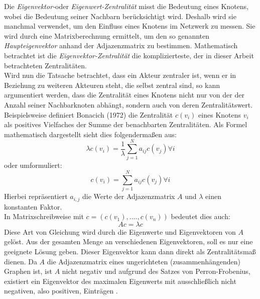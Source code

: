 Die \textit{Eigenvektor-}oder \textit{Eigenwert-Zentralität} misst die Bedeutung eines Knotens, wobei die Bedeutung seiner Nachbarn berücksichtigt wird. Deshalb wird sie manchmal verwendet, um den Einfluss eines Knotens im Netzwerk zu messen. Sie wird durch eine Matrixberechnung ermittelt, um den so genannten \textit{Haupteigenvektor} anhand der Adjazenzmatrix zu bestimmen. Mathematisch betrachtet ist die \textit{Eigenvektor-Zentralität} die komplizierteste, der in dieser Arbeit betrachteten Zentralitäten.\\
Wird nun die Tatsache betrachtet, dass ein Akteur zentraler ist, wenn er in Beziehung zu weiteren Akteuren steht, die selbst zentral sind, so kann argumentiert werden, dass die Zentralität eines Knotens nicht nur von der der Anzahl seiner Nachbarknoten abhängt, sondern auch von deren Zentralitätswert. Beispielsweise definiert Bonacich (1972) die Zentralität $c(v_i)$ eines Knotens $v_i$ als positives Vielfaches der Summe der benachbarten Zentralitäten. Als Formel mathematisch dargestellt sieht dies folgendermaßen aus:
\begin{equation}
     \lambda c(v_i) = \frac{1}{\lambda} \sum_{j=1}^{N}a_{ij}c(v_j) \forall i
\end{equation} oder umformuliert:  
\begin{equation}
     c(v_i) = \sum_{j=1}^{N}a_{ij}c(v_j) \forall i
\end{equation}
Hierbei repräsentiert $a_{i,j}$ die Werte der Adjazenzmatrix $A$ und $\lambda$ einen konstanten Faktor. \\
In Matrixschreibweise mit $c = (c(v_1), ...., c(v_n))$ bedeutet dies auch:
\begin{equation}
     Ac = \lambda c
\end{equation}
Diese Art von Gleichung wird durch die Eigenwerte und Eigenvektoren von $A$ gelöst.
Aus der gesamten Menge an verschiedenen Eigenvektoren, soll es nur eine geeignete Lösung geben. 
Dieser Eigenvektor kann dann direkt als Zentralitätsmaß dienen. Da $A$ die Adjazenzmatrix eines ungerichteten (zusammenhängenden) Graphen ist, ist $A$ nicht negativ und aufgrund des Satzes von Perron-Frobenius, existiert ein Eigenvektor des maximalen Eigenwerts mit ausschließlich nicht negativen, also positiven, Einträgen \cite{brittaRuhnau}.

